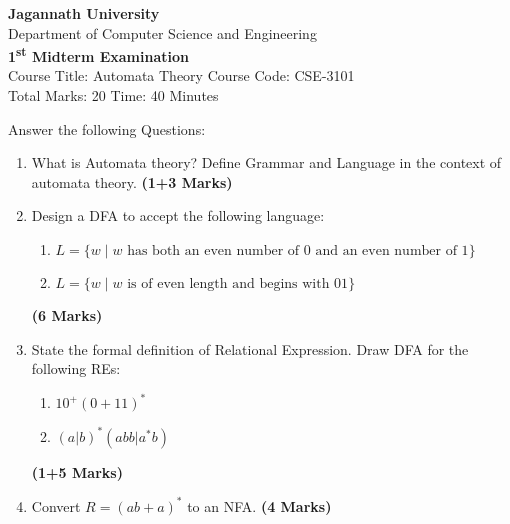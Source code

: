 \documentclass{article}
\begin{document}
\begin{center}
    \textbf{Jagannath University} \\
    Department of Computer Science and Engineering \\
    \textbf{1\textsuperscript{st} Midterm Examination} \\
    Course Title: Automata Theory \hspace{0.2cm} Course Code: CSE-3101 \\
    Total Marks: 20 \hspace{0.2cm} Time: 40 Minutes
\end{center}

\noindent Answer the following Questions:

\begin{enumerate}
    \item What is Automata theory? Define Grammar and Language in the context of automata theory. \hspace{1cm} \textbf{(1+3 Marks)}
    \item Design a DFA to accept the following language:
    \begin{enumerate}
        \item \( L = \{ w \mid w \text{ has both an even number of 0 and an even number of 1} \} \)
        \item \( L = \{ w \mid w \text{ is of even length and begins with 01} \} \)
    \end{enumerate}
    \hspace{1cm} \textbf{(6 Marks)}
    \item State the formal definition of Relational Expression. Draw DFA for the following REs:
    \begin{enumerate}
        \item \( 10^+ (0+11)^* \)
        \item \( (a|b)^*(abb|a^*b) \)
    \end{enumerate}
    \hspace{1cm} \textbf{(1+5 Marks)}
    \item Convert \( R = (ab+a)^* \) to an NFA. \hspace{1cm} \textbf{(4 Marks)}
\end{enumerate}
\end{document}
